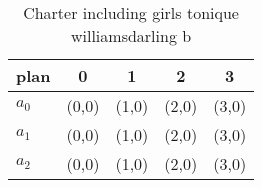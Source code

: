 \documentclass[a4paper]{article}
\begin{document}
\begin{table}
\begin{adjustbox}{width=0.5\columnwidth}
\begin{tabular}{|l|l|l|l|l|}
\hline
\textbf{plan} & \multicolumn{1}{c|}{\textbf{0}} & \multicolumn{1}{c|}{\textbf{1}} & \multicolumn{1}{c|}{\textbf{2}} & \multicolumn{1}{c|}{\textbf{3}} \\ \hline
\textbf{$a_0$}  & (0,0) & (1,0) & (2,0) & (3,0) \\ \hline
\textbf{$a_1$}  & (0,0) & (1,0) & (2,0) & (3,0) \\ \hline
\textbf{$a_2$}  & (0,0) & (1,0) & (2,0) & (3,0) \\ \hline
\end{tabular}
\end{adjustbox}
\caption{Charter including girls tonique williamsdarling b
}
\end{table}
\end{document}
